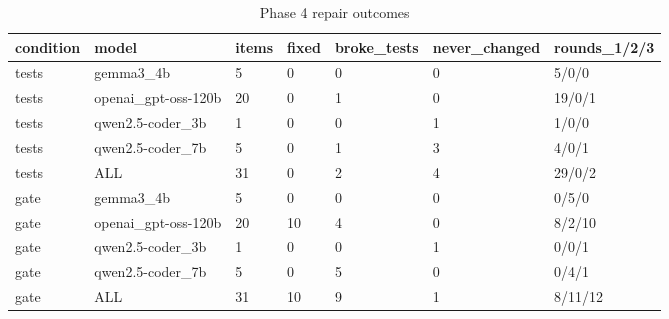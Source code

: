 \begin{table}[t]
\centering
\caption{Phase 4 repair outcomes}
\small
\begin{tabular}{lllllll}
\hline
condition & model & items & fixed & broke\_tests & never\_changed & rounds\_1/2/3 \\
\hline
tests & gemma3\_4b & 5 & 0 & 0 & 0 & 5/0/0 \\
tests & openai\_gpt-oss-120b & 20 & 0 & 1 & 0 & 19/0/1 \\
tests & qwen2.5-coder\_3b & 1 & 0 & 0 & 1 & 1/0/0 \\
tests & qwen2.5-coder\_7b & 5 & 0 & 1 & 3 & 4/0/1 \\
tests & ALL & 31 & 0 & 2 & 4 & 29/0/2 \\
gate & gemma3\_4b & 5 & 0 & 0 & 0 & 0/5/0 \\
gate & openai\_gpt-oss-120b & 20 & 10 & 4 & 0 & 8/2/10 \\
gate & qwen2.5-coder\_3b & 1 & 0 & 0 & 1 & 0/0/1 \\
gate & qwen2.5-coder\_7b & 5 & 0 & 5 & 0 & 0/4/1 \\
gate & ALL & 31 & 10 & 9 & 1 & 8/11/12 \\
\hline
\end{tabular}
\end{table}
